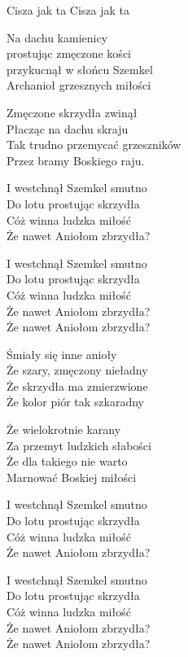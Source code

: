 {Cisza jak ta}
{Cisza jak ta}
\begin{text}
\hfill\break
\hfill\break
\ifOneCol \else \hfill\break \fi
Na dachu kamienicy\\
prostując zmęczone kości\\
przykucnął w słońcu Szemkel\\
Archanioł grzesznych miłości

Zmęczone skrzydła zwinął\\
Płacząc na dachu skraju\\
Tak trudno przemycać grzeszników\\
Przez bramy Boskiego raju.

\vin I westchnął Szemkel smutno\\
\vin Do lotu prostując skrzydła\\
\vin Cóż winna ludzka miłość\\
\vin Że nawet Aniołom zbrzydła?

\vin I westchnął Szemkel smutno\\
\vin Do lotu prostując skrzydła\\
\vin Cóż winna ludzka miłość\\
\vin Że nawet Aniołom zbrzydła?\\
\vin Że nawet Aniołom zbrzydła?

\hfill\break
\ifOneCol \else \hfill\break \fi
Śmiały się inne anioły\\
Że szary, zmęczony nieładny\\
Że skrzydła ma zmierzwione\\
Że kolor piór tak szkaradny

Że wielokrotnie karany\\
Za przemyt ludzkich słabości\\
Że dla takiego nie warto\\
Marnować Boskiej miłości

\vin I westchnął Szemkel smutno\\
\vin Do lotu prostując skrzydła\\
\vin Cóż winna ludzka miłość\\
\vin Że nawet Aniołom zbrzydła?

\vin I westchnął Szemkel smutno\\
\vin Do lotu prostując skrzydła\\
\vin Cóż winna ludzka miłość\\
\vin Że nawet Aniołom zbrzydła?\\
\vin Że nawet Aniołom zbrzydła?


\end{text}
